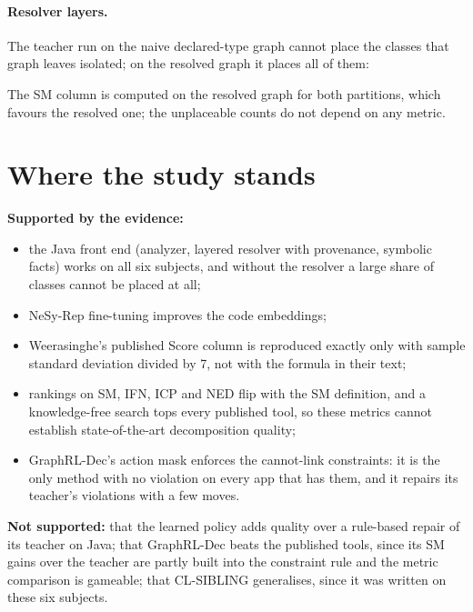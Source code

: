 \documentclass[10pt,a4paper]{article}
\begin{document}
\paragraph{Resolver layers.} The teacher run on the naive declared-type graph cannot place the classes that graph leaves isolated; on the resolved graph it places all of them:
\begin{center}\small{}\end{center}
The SM column is computed on the resolved graph for both partitions, which favours the resolved one; the unplaceable counts do not depend on any metric.
\section{Where the study stands}
\textbf{Supported by the evidence:}
\begin{itemize}\setlength{\itemsep}{2pt}
\item the Java front end (analyzer, layered resolver with provenance, symbolic facts) works on all six subjects, and without the resolver a large share of classes cannot be placed at all;
\item NeSy-Rep fine-tuning improves the code embeddings;
\item Weerasinghe's published Score column is reproduced exactly only with sample standard deviation divided by 7, not with the formula in their text;
\item rankings on SM, IFN, ICP and NED flip with the SM definition, and a knowledge-free search tops every published tool, so these metrics cannot establish state-of-the-art decomposition quality;
\item GraphRL-Dec's action mask enforces the cannot-link constraints: it is the only method with no violation on every app that has them, and it repairs its teacher's violations with a few moves.
\end{itemize}
\textbf{Not supported:} that the learned policy adds quality over a rule-based repair of its teacher on Java; that GraphRL-Dec beats the published tools, since its SM gains over the teacher are partly built into the constraint rule and the metric comparison is gameable; that CL-SIBLING generalises, since it was written on these six subjects.
\end{document}
